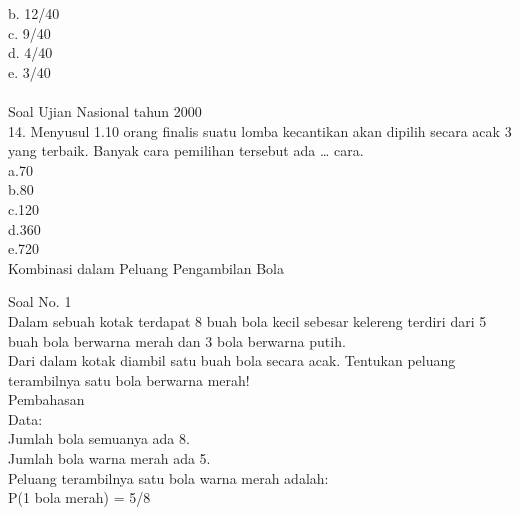 \documentclass[11pt,fleqn]{book} %
\begin{document}
b. 12/40\\

c. 9/40\\

d. 4/40\\

e. 3/40\\
\\

Soal Ujian Nasional tahun 2000\\
14. Menyusul 1.10 orang finalis suatu lomba kecantikan akan dipilih secara acak 3 yang terbaik. Banyak cara pemilihan tersebut ada … cara.\\

a.70\\

b.80\\

c.120\\

d.360\\

e.720\\


Kombinasi dalam Peluang Pengambilan Bola

Soal No. 1\\
Dalam sebuah kotak terdapat 8 buah bola kecil sebesar kelereng terdiri dari 5 buah bola berwarna merah dan 3 bola berwarna putih.\\
Dari dalam kotak diambil satu buah bola secara acak.
Tentukan peluang terambilnya satu bola berwarna merah!\\

Pembahasan\\
Data:\\
Jumlah bola semuanya ada 8.\\
Jumlah bola warna merah ada 5.\\

Peluang terambilnya satu bola warna merah adalah:\\
P(1 bola merah) = 5/8 \\
\end{document}
